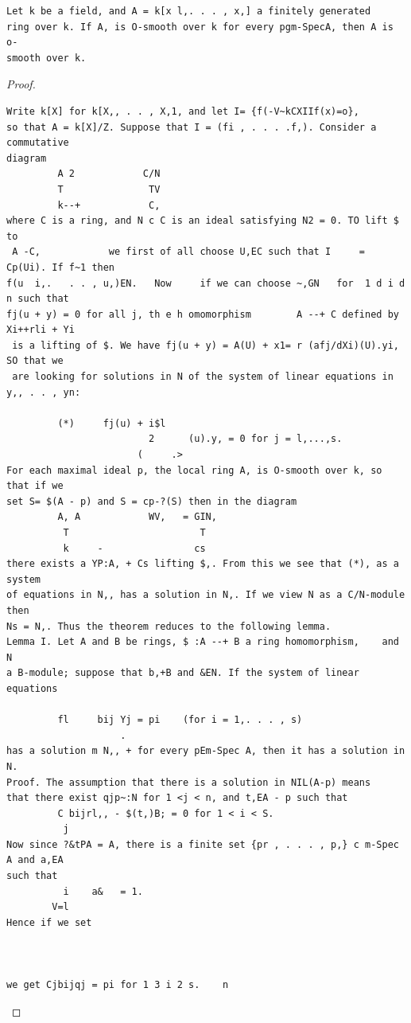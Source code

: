\begin{theorem}\label{mcrt-auto-theorem-30-2}\uses{}
\begin{verbatim}
Let k be a field, and A = k[x l,. . . , x,] a finitely generated
ring over k. If A, is O-smooth over k for every pgm-SpecA, then A is o-
smooth over k.
\end{verbatim}
\end{theorem}
\begin{proof}
\begin{verbatim}
Write k[X] for k[X,, . . , X,1, and let I= {f(-V~kCXIIf(x)=o},
so that A = k[X]/Z. Suppose that I = (fi , . . . .f,). Consider a commutative
diagram
         A 2            C/N
         T               TV
         k--+            C,
where C is a ring, and N c C is an ideal satisfying N2 = 0. TO lift $ to
 A -C,            we first of all choose U,EC such that I     = Cp(Ui). If f~1 then
f(u  i,.   . . , u,)EN.   Now     if we can choose ~,GN   for  1 d i d n such that
fj(u + y) = 0 for all j, th e h omomorphism        A --+ C defined by Xi++rli + Yi
 is a lifting of $. We have fj(u + y) = A(U) + x1= r (afj/dXi)(U).yi, SO that we
 are looking for solutions in N of the system of linear equations in y,, . . , yn:

         (*)     fj(u) + i$l
                         2      (u).y, = 0 for j = l,...,s.
                       (     .>
For each maximal ideal p, the local ring A, is O-smooth over k, so that if we
set S= $(A - p) and S = cp-?(S) then in the diagram
         A, A            WV,   = GIN,
          T                       T
          k     -                cs
there exists a YP:A, + Cs lifting $,. From this we see that (*), as a system
of equations in N,, has a solution in N,. If we view N as a C/N-module then
Ns = N,. Thus the theorem reduces to the following lemma.
Lemma I. Let A and B be rings, $ :A --+ B a ring homomorphism,    and N
a B-module; suppose that b,+B and &EN. If the system of linear equations

         fl     bij Yj = pi    (for i = 1,. . . , s)
                    .
has a solution m N,, + for every pEm-Spec A, then it has a solution in N.
Proof. The assumption that there is a solution in NIL(A-p) means
that there exist qjp~:N for 1 <j < n, and t,EA - p such that
         C bijrl,, - $(t,)B; = 0 for 1 < i < S.
          j
Now since ?&tPA = A, there is a finite set {pr , . . . , p,} c m-Spec A and a,EA
such that
          i    a&   = 1.
        V=l
Hence if we set



we get Cjbijqj = pi for 1 3 i 2 s.    n
\end{verbatim}
\end{proof}


